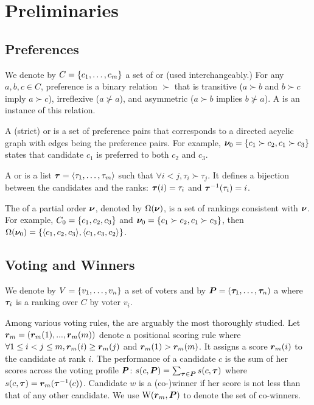 \section{Preliminaries}
\label{sec:preliminaries}

\subsection{Preferences}

We denote by $C = \set{\enum{c}}$ a set of  or  (used interchangeably.) For any $a, b, c \in C$, preference is a binary relation $\succ$ that is transitive ($a \succ b$ and $b \succ c$ imply $a \succ c$), irreflexive ($a \not\succ a$), and asymmetric ($a \succ b$ implies $b \not\succ a$).
A  is an instance of this relation.

A (strict)  or  is a set of preference pairs that corresponds to a directed acyclic graph with edges being the preference pairs.
For example, $\partialOrder_0 = \set{c_1 \succ c_2, c_1 \succ c_3}$ states that candidate $c_1$ is preferred to both $c_2$ and $c_3$.

A  or  is a list $\ranking = \angs{\enum{\tau}}$ such that $\forall i < j, \tau_i \succ \tau_j$.
It defines a bijection between the candidates and the ranks: $\ranking(i) = \tau_i$ and $\ranking^{-1}(\tau_i) = i$.

The  of a partial order $\partialOrder$, denoted by $\Omega(\partialOrder)$, is a set of rankings consistent with $\partialOrder$.
For example, $C_0 = \set{c_1, c_2, c_3}$ and $\partialOrder_0 = \set{c_1 \succ c_2, c_1 \succ c_3}$, then $\Omega(\partialOrder_0) = \set{\angs{c_1, c_2, c_3}, \angs{c_1, c_3, c_2}}$.

\subsection{Voting and Winners}
\label{sec:preliminaries:vote}

We denote by $V = \set{\enum[n]{v}}$ a set of voters and by $\completeVP = (\enum[n]{\ranking})$ a  where $\ranking_i$ is a ranking over $C$ by voter $v_i$.

Among various voting rules, the  are arguably the most thoroughly studied.
Let $\vr_m = (\vr_m(1), ..., \vr_m(m))$ denote a positional scoring rule where $\forall 1 \leq i < j \leq m, \vr_m(i) \geq \vr_m(j)$ and $\vr_m(1) > \vr_m(m)$.
It assigns a score $\vr_m(i)$ to the candidate at rank $i$.  The performance of a candidate $c$ is the sum of her scores across the voting profile $\completeVP$:
$\score(c, \completeVP) = \sum_{\ranking \in \completeVP}{\score(c, \ranking)}$ where $\score(c, \ranking) = \vr_m(\ranking^{-1}(c))$.
Candidate $w$ is a (co-)winner if her score is not less than that of any other candidate.
We use $\winners(\vr_m, \completeVP)$ to denote the set of co-winners.

